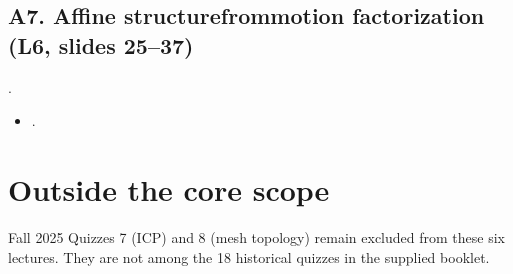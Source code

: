 \documentclass[letterpaper,11pt,english,openany,oneside]{jupyterBook}
\begin{document}
\subsection{A7. Affine structure\sphinxhyphen{}from\sphinxhyphen{}motion factorization (L6, slides 25–37)}
\label{\detokenize{reference/quiz-index:a7-affine-structure-from-motion-factorization-l6-slides-2537}}
\sphinxAtStartPar
{} . 
\begin{itemize}
\item {}
\sphinxAtStartPar
{\hyperref[\detokenize{lectures/lecture06/quiz-workbook:quiz-a7-q1}]{}}.

\end{itemize}


\section{Outside the core scope}
\label{\detokenize{reference/quiz-index:outside-the-core-scope}}
\sphinxAtStartPar
Fall 2025 Quizzes 7 (ICP) and 8 (mesh topology) remain excluded from these six lectures. They are not among the 18 historical quizzes in the supplied booklet.

\sphinxstepscope
\end{document}
